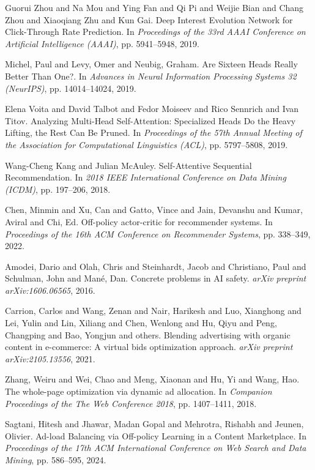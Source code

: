 \begin{thebibliography}{99}
 Guorui Zhou and Na Mou and Ying Fan and Qi Pi and Weijie Bian and  Chang Zhou and Xiaoqiang Zhu and Kun Gai. {D}eep {I}nterest {E}volution {N}etwork for {C}lick-{T}hrough {R}ate {P}rediction. In \textit{Proceedings of the 33rd AAAI Conference on Artificial Intelligence (AAAI)}, pp. 5941--5948, 2019.

 Michel, Paul and Levy, Omer and Neubig, Graham. {A}re {S}ixteen {H}eads {R}eally {B}etter {T}han {O}ne?. In \textit{Advances in Neural Information Processing Systems 32 (NeurIPS)}, pp. 14014--14024, 2019.

 Elena Voita and David Talbot and Fedor Moiseev and Rico Sennrich and  Ivan Titov. {A}nalyzing {M}ulti-{H}ead {S}elf-{A}ttention: {S}pecialized {H}eads {D}o the 
{H}eavy {L}ifting, the {R}est {C}an {B}e {P}runed. In \textit{Proceedings of the 57th Annual Meeting of the Association for 
Computational Linguistics (ACL)}, pp. 5797--5808, 2019.

 Wang-Cheng Kang and Julian McAuley. {S}elf-{A}ttentive {S}equential {R}ecommendation. In \textit{2018 IEEE International Conference on Data Mining (ICDM)}, pp. 197--206, 2018.

 Chen, Minmin and Xu, Can and Gatto, Vince and Jain, Devanshu and Kumar, Aviral and Chi, Ed. {O}ff-policy actor-critic for recommender systems. In \textit{Proceedings of the 16th ACM Conference on Recommender Systems}, pp. 338--349, 2022.

 Amodei, Dario and Olah, Chris and Steinhardt, Jacob and Christiano, Paul and Schulman, John and Man{\'e}, Dan. {C}oncrete problems in {A}I safety. \textit{arXiv preprint arXiv:1606.06565}, 2016.

 Carrion, Carlos and Wang, Zenan and Nair, Harikesh and Luo, Xianghong and Lei, Yulin and Lin, Xiliang and Chen, Wenlong and Hu, Qiyu and Peng, Changping and Bao, Yongjun and others. {B}lending advertising with organic content in e-commerce: {A} virtual bids optimization approach. \textit{arXiv preprint arXiv:2105.13556}, 2021.

 Zhang, Weiru and Wei, Chao and Meng, Xiaonan and Hu, Yi and Wang, Hao. {T}he whole-page optimization via dynamic ad allocation. In \textit{Companion Proceedings of the The Web Conference 2018}, pp. 1407--1411, 2018.

 Sagtani, Hitesh and Jhawar, Madan Gopal and Mehrotra, Rishabh and Jeunen, Olivier. {A}d-load {B}alancing via {O}ff-policy {L}earning in a {C}ontent {M}arketplace. In \textit{Proceedings of the 17th ACM International Conference on Web Search and Data Mining}, pp. 586--595, 2024.


\end{thebibliography}

